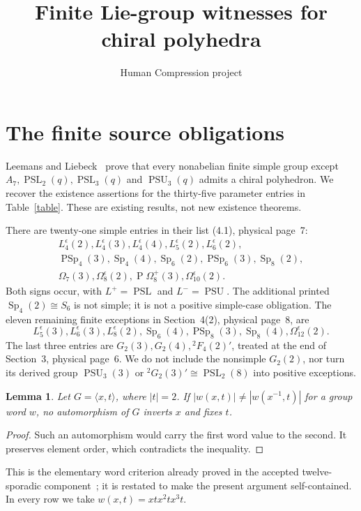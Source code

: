 \documentclass[10pt,a4paper]{article}
\title{Finite Lie-group witnesses for chiral polyhedra}
\author{Human Compression project}\date{}
\newtheorem{lemma}{Lemma}
\begin{document}
\maketitle
\section{The finite source obligations}
Leemans and Liebeck~\cite{LL} prove that every nonabelian finite simple
group except $A_7,\operatorname{PSL}_2(q),\operatorname{PSL}_3(q)$ and
$\operatorname{PSU}_3(q)$ admits a chiral polyhedron. We recover the
existence assertions for the thirty-five parameter entries in Table~\ref{table}.
These are existing results, not new existence theorems.

There are twenty-one simple entries in their list (4.1), physical page~7:
\[
\begin{gathered}
 L_4^\epsilon(2),L_4^\epsilon(3),L_4^\epsilon(4),L_5^\epsilon(2),L_6^\epsilon(2),\\
 \operatorname{PSp}_4(3),\operatorname{Sp}_4(4),\operatorname{Sp}_6(2),
 \operatorname{PSp}_6(3),\operatorname{Sp}_8(2),\\
 \Omega_7(3),\Omega_8^\epsilon(2),\operatorname{P}\Omega_8^+(3),\Omega_{10}^\epsilon(2).
\end{gathered}
\]
Both signs occur, with $L^+=\operatorname{PSL}$ and $L^-=\operatorname{PSU}$.
The additional printed $\operatorname{Sp}_4(2)\cong S_6$ is not simple;
it is not a positive simple-case obligation. The eleven remaining finite
exceptions in Section~4(2), physical page~8, are
\[
 L_5^\epsilon(3),L_6^\epsilon(3),L_8^\epsilon(2),
 \operatorname{Sp}_6(4),\operatorname{PSp}_8(3),\operatorname{Sp}_8(4),
 \Omega_{12}^\epsilon(2).
\]
The last three entries are $G_2(3),G_2(4),{}^2F_4(2)'$, treated at the end
of Section~3, physical page~6. We do not include the nonsimple
$G_2(2)$, nor turn its derived group $\operatorname{PSU}_3(3)$ or
${}^2G_2(3)'\cong\operatorname{PSL}_2(8)$ into positive exceptions.

\begin{lemma}\label{word}
Let $G=\langle x,t\rangle$, where $|t|=2$. If
$|w(x,t)|\ne|w(x^{-1},t)|$ for a group word $w$, no automorphism of
$G$ inverts $x$ and fixes $t$.
\end{lemma}
\begin{proof}
Such an automorphism would carry the first word value to the second.
It preserves element order, which contradicts the inequality.
\end{proof}
This is the elementary word criterion already proved in the accepted
twelve-sporadic component~\cite{word}; it is restated to make the present
argument self-contained. In every row we take
$w(x,t)=xtx^2tx^3t$.
\end{document}
